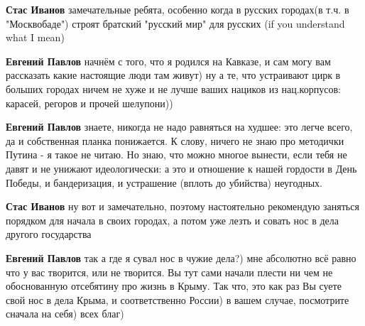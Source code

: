 \begin{itemize}
\begin{itemize}
 
\textbf{Стас Иванов} замечательные ребята, особенно когда в русских городах(в т.ч. в "Москвобаде") строят братский "русский мир" для русских (if you understand what I mean)

 
\textbf{Евгений Павлов} начнём с того, что я родился на Кавказе, и сам могу вам рассказать какие настоящие люди там живут) ну а те, что устраивают цирк в больших городах ничем не хуже и не лучше ваших нациков из нац.корпусов: карасей, регоров и прочей шелупони))

 
\textbf{Евгений Павлов} знаете, никогда не надо равняться на худшее: это легче всего, да и собственная планка понижается. К слову, ничего не знаю про методички Путина - я такое не читаю. Но знаю, что можно многое вынести, если тебя не давят и не унижают идеологически: а это и отношение к нашей гордости в День Победы, и бандеризация, и устрашение (вплоть до убийства) неугодных.

 
\textbf{Стас Иванов} ну вот и замечательно, поэтому настоятельно рекомендую заняться порядком для начала в своих городах, а потом уже лезть и совать нос в дела другого государства

 
\textbf{Евгений Павлов} так а где я сувал нос в чужие дела?) мне абсолютно всё равно что у вас творится, или не творится. Вы тут сами начали плести ни чем не обоснованную отсебятину про жизнь в Крыму. Так что, это как раз Вы суете свой нос в дела Крыма, и соответственно России) в вашем случае, посмотрите сначала на себя) всех благ)


\end{itemize}
\end{itemize}

